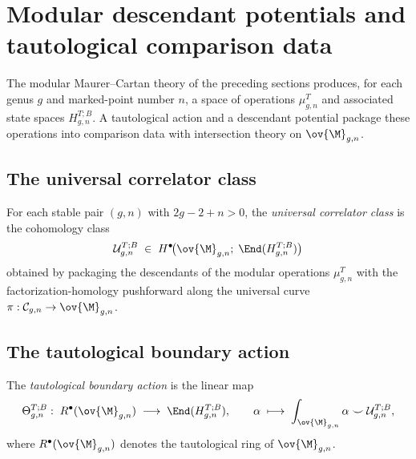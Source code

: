 \section{Modular descendant potentials and tautological comparison data}
\label{sec:modular-descendant-potentials}

The modular Maurer--Cartan theory of the preceding sections produces, for each genus $g$
and marked-point number $n$, a space of operations $\mu_{g,n}^T$ and associated state
spaces $H_{g,n}^{T;B}$. A tautological action and a descendant potential package these
operations into comparison data with intersection theory on $\ov{\M}_{g,n}$.

\subsection{The universal correlator class}
\label{subsec:universal-correlator-class}

\begin{definition}
\label{def:universal-correlator-class}
For each stable pair $(g,n)$ with $2g-2+n > 0$, the \emph{universal correlator class} is
the cohomology class
\begin{equation}
\label{eq:universal-correlator-class}
\mathcal{U}_{g,n}^{T;B}
\;\in\;
H^\bullet\!\bigl(\ov{\M}_{g,n};\;\End(H_{g,n}^{T;B})\bigr)
\end{equation}
obtained by packaging the descendants of the modular operations $\mu_{g,n}^T$ with the
factorization-homology pushforward along the universal curve
$\pi: \mathcal{C}_{g,n} \to \ov{\M}_{g,n}$.
\end{definition}

\subsection{The tautological boundary action}
\label{subsec:tautological-boundary-action}

\begin{definition}
\label{def:tautological-boundary-action}
The \emph{tautological boundary action} is the linear map
\begin{equation}
\label{eq:tautological-action}
\Theta_{g,n}^{T;B}:\;
R^\bullet(\ov{\M}_{g,n})
\;\longrightarrow\;
\End(H_{g,n}^{T;B}),
\qquad
\alpha \;\longmapsto\;
\int_{\ov{\M}_{g,n}} \alpha \smile \mathcal{U}_{g,n}^{T;B},
\end{equation}
where $R^\bullet(\ov{\M}_{g,n})$ denotes the tautological ring of $\ov{\M}_{g,n}$.
\end{definition}

